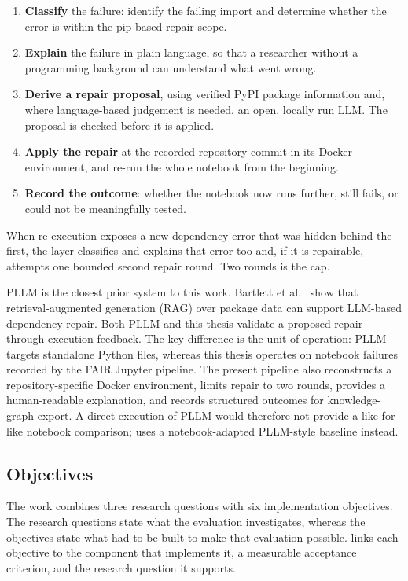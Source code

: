 \begin{enumerate}
  \item \textbf{Classify} the failure: identify the failing import and
        determine whether the error is within the pip-based repair scope.
  \item \textbf{Explain} the failure in plain language, so that a researcher
        without a programming background can understand what went wrong.
  \item \textbf{Derive a repair proposal}, using verified PyPI package
        information and, where language-based judgement is needed, an open,
        locally run LLM. The proposal is checked before it is applied.
  \item \textbf{Apply the repair} at the recorded repository commit in its
        Docker environment, and re-run the whole notebook from the beginning.
  \item \textbf{Record the outcome}: whether the notebook now runs further,
        still fails, or could not be meaningfully tested.
  \end{enumerate}

When re-execution exposes a new dependency error that was hidden behind
the first, the layer classifies and explains that error too and, if it is
repairable, attempts one bounded second repair round. Two rounds is the
cap.

PLLM is the closest prior system to this work. Bartlett et
al.~\cite{bartlett2025pllm} show that retrieval-augmented generation (RAG)
over package data can support LLM-based dependency repair. Both PLLM and this
thesis validate a proposed repair through execution feedback. The key
difference is the unit of operation: PLLM targets standalone Python files,
whereas this thesis operates on notebook failures recorded by the FAIR Jupyter
pipeline. The present pipeline also reconstructs a repository-specific Docker
environment, limits repair to two rounds, provides a human-readable
explanation, and records structured outcomes for knowledge-graph export. A
direct execution of PLLM would therefore not provide a like-for-like notebook
comparison;  uses a notebook-adapted PLLM-style
baseline instead.

\subsection{Objectives}
\label{sec:intro-objectives}

The work combines three research questions with six implementation
objectives. The research questions state what the evaluation investigates,
whereas the objectives state what had to be built to make that evaluation
possible.  links each objective to the component
that implements it, a measurable acceptance criterion, and the research
question it supports.

